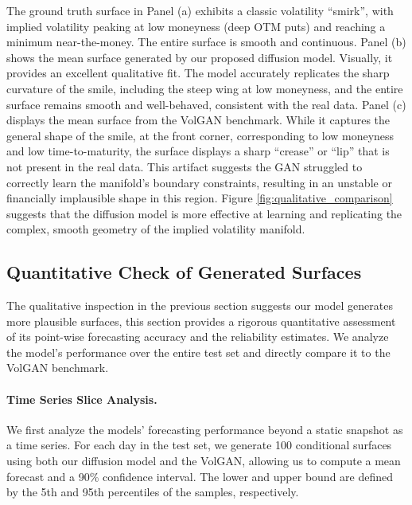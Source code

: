\documentclass{article}
\begin{document}
The ground truth surface in Panel (a) exhibits a classic volatility ``smirk'', with implied volatility peaking at low moneyness (deep OTM puts) and reaching a minimum near-the-money. The entire surface is smooth and continuous. Panel (b) shows the mean surface generated by our proposed diffusion model. Visually, it provides an excellent qualitative fit. The model accurately replicates the sharp curvature of the smile, including the steep wing at low moneyness, and the entire surface remains smooth and well-behaved, consistent with the real data. Panel (c) displays the mean surface from the VolGAN benchmark. While it captures the general shape of the smile, at the front corner, corresponding to low moneyness and low time-to-maturity, the surface displays a sharp ``crease'' or ``lip'' that is not present in the real data. This artifact suggests the GAN struggled to correctly learn the manifold's boundary constraints, resulting in an unstable or financially implausible shape in this region. Figure \ref{fig:qualitative_comparison} suggests that the diffusion model is more effective at learning and replicating the complex, smooth geometry of the implied volatility manifold.

\subsection{Quantitative Check of Generated Surfaces}
The qualitative inspection in the previous section suggests our model generates more plausible surfaces, this section provides a rigorous quantitative assessment of its point-wise forecasting accuracy and the reliability estimates. We analyze the model's performance over the entire test set and directly compare it to the VolGAN benchmark.

\paragraph{Time Series Slice Analysis.} We first analyze the models' forecasting performance beyond a static snapshot as a time series. For each day in the test set, we generate 100 conditional surfaces using both our diffusion model and the VolGAN, allowing us to compute a mean forecast and a 90\% confidence interval. The lower and upper bound are defined by the 5th and 95th percentiles of the samples, respectively.
\end{document}
